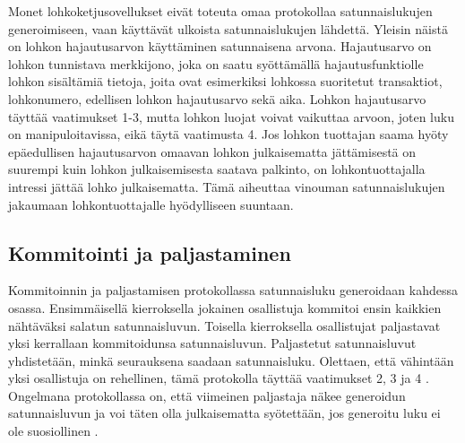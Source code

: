 \documentclass{article}
\begin{document}
Monet lohkoketjusovellukset eivät toteuta omaa protokollaa satunnaislukujen generoimiseen, vaan käyttävät ulkoista satunnaislukujen lähdettä. Yleisin näistä on lohkon hajautusarvon käyttäminen satunnaisena arvona. Hajautusarvo on lohkon tunnistava merkkijono, joka on saatu syöttämällä hajautusfunktiolle lohkon sisältämiä tietoja, joita ovat esimerkiksi lohkossa suoritetut transaktiot, lohkonumero, edellisen lohkon hajautusarvo sekä aika. Lohkon hajautusarvo täyttää vaatimukset 1-3, mutta lohkon luojat voivat vaikuttaa arvoon, joten luku on manipuloitavissa, eikä täytä vaatimusta 4. Jos lohkon tuottajan saama hyöty epäedullisen hajautusarvon omaavan lohkon julkaisematta jättämisestä on suurempi kuin lohkon julkaisemisesta saatava palkinto, on lohkontuottajalla intressi jättää lohko julkaisematta. Tämä aiheuttaa vinouman satunnaislukujen jakaumaan lohkontuottajalle hyödylliseen suuntaan.


\subsection{Kommitointi ja paljastaminen}
Kommitoinnin ja paljastamisen protokollassa satunnaisluku generoidaan kahdessa osassa. Ensimmäisellä kierroksella jokainen osallistuja kommitoi ensin kaikkien nähtäväksi salatun satunnaisluvun. Toisella kierroksella osallistujat paljastavat yksi kerrallaan kommitoidunsa satunnaisluvun. Paljastetut satunnaisluvut yhdistetään, minkä seurauksena saadaan satunnaisluku. Olettaen, että vähintään yksi osallistuja on rehellinen, tämä protokolla täyttää vaatimukset 2, 3 ja 4 \cite{simic_review_2020}. Ongelmana protokollassa on, että viimeinen paljastaja näkee generoidun satunnaisluvun ja voi täten olla julkaisematta syötettään, jos generoitu luku ei ole suosiollinen \cite{simic_review_2020}.
\end{document}
